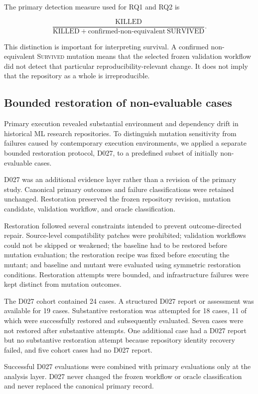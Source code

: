 The primary detection measure used for RQ1 and RQ2 is

\[
\frac{\mathrm{KILLED}}
     {\mathrm{KILLED} +
      \mathrm{confirmed\text{-}non\text{-}equivalent\ SURVIVED}}.
\]

This distinction is important for interpreting survival. A confirmed
non-equivalent \textsc{Survived} mutation means that the selected frozen
validation workflow did not detect that particular reproducibility-relevant
change. It does not imply that the repository as a whole is irreproducible.


\subsection{Bounded restoration of non-evaluable cases}
\label{sec:d027-restoration}

Primary execution revealed substantial environment and dependency drift in
historical ML research repositories. To distinguish mutation sensitivity from
failures caused by contemporary execution environments, we applied a separate
bounded restoration protocol, D027, to a predefined subset of initially
non-evaluable cases.

D027 was an additional evidence layer rather than a revision of the primary
study. Canonical primary outcomes and failure classifications were retained
unchanged. Restoration preserved the frozen repository revision, mutation
candidate, validation workflow, and oracle classification.

Restoration followed several constraints intended to prevent outcome-directed
repair. Source-level compatibility patches were prohibited; validation
workflows could not be skipped or weakened; the baseline had to be restored
before mutation evaluation; the restoration recipe was fixed before executing
the mutant; and baseline and mutant were evaluated using symmetric restoration
conditions. Restoration attempts were bounded, and infrastructure failures
were kept distinct from mutation outcomes.

The D027 cohort contained 24 cases. A structured D027 report or assessment was
available for 19 cases. Substantive restoration was attempted for 18 cases, 11
of which were successfully restored and subsequently evaluated. Seven cases
were not restored after substantive attempts. One additional case had a D027
report but no substantive restoration attempt because repository identity
recovery failed, and five cohort cases had no D027 report.

Successful D027 evaluations were combined with primary evaluations only at the
analysis layer. D027 never changed the frozen workflow or oracle
classification and never replaced the canonical primary record.


